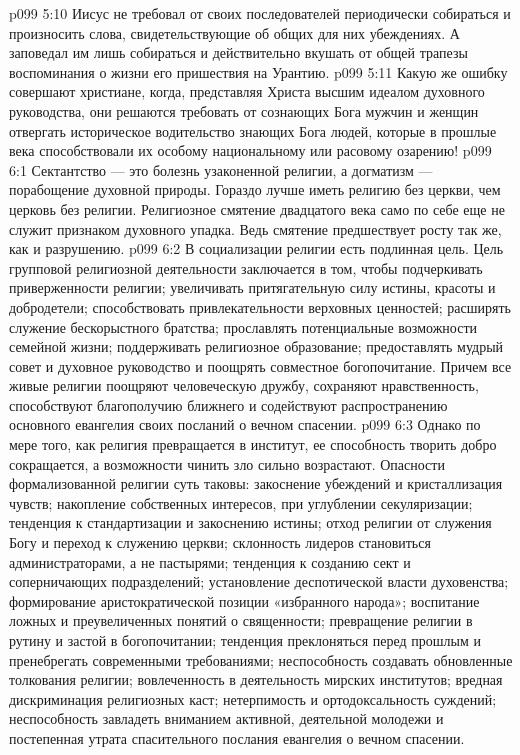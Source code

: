 \vs p099 5:10 Иисус не требовал от своих последователей периодически собираться и произносить слова, свидетельствующие об общих для них убеждениях. А заповедал им лишь собираться и действительно  вкушать от общей трапезы воспоминания о жизни его пришествия на Урантию.
\vs p099 5:11 \pc Какую же ошибку совершают христиане, когда, представляя Христа высшим идеалом духовного руководства, они решаются требовать от сознающих Бога мужчин и женщин отвергать историческое водительство знающих Бога людей, которые в прошлые века способствовали их особому национальному или расовому озарению!
\vs p099 6:1 Сектантство --- это болезнь узаконенной религии, а догматизм --- порабощение духовной природы. Гораздо лучше иметь религию без церкви, чем церковь без религии. Религиозное смятение двадцатого века само по себе еще не служит признаком духовного упадка. Ведь смятение предшествует росту так же, как и разрушению.
\vs p099 6:2 В социализации религии есть подлинная цель. Цель групповой религиозной деятельности заключается в том, чтобы подчеркивать приверженности религии; увеличивать притягательную силу истины, красоты и добродетели; способствовать привлекательности верховных ценностей; расширять служение бескорыстного братства; прославлять потенциальные возможности семейной жизни; поддерживать религиозное образование; предоставлять мудрый совет и духовное руководство и поощрять совместное богопочитание. Причем все живые религии поощряют человеческую дружбу, сохраняют нравственность, способствуют благополучию ближнего и содействуют распространению основного евангелия своих посланий о вечном спасении.
\vs p099 6:3 Однако по мере того, как религия превращается в институт, ее способность творить добро сокращается, а возможности чинить зло сильно возрастают. Опасности формализованной религии суть таковы: закоснение убеждений и кристаллизация чувств; накопление собственных интересов, при углублении секуляризации; тенденция к стандартизации и закоснению истины; отход религии от служения Богу и переход к служению церкви; склонность лидеров становиться администраторами, а не пастырями; тенденция к созданию сект и соперничающих подразделений; установление деспотической власти духовенства; формирование аристократической позиции «избранного народа»; воспитание ложных и преувеличенных понятий о священности; превращение религии в рутину и застой в богопочитании; тенденция преклоняться перед прошлым и пренебрегать современными требованиями; неспособность создавать обновленные толкования религии; вовлеченность в деятельность мирских институтов; вредная дискриминация религиозных каст; нетерпимость и ортодоксальность суждений; неспособность завладеть вниманием активной, деятельной молодежи и постепенная утрата спасительного послания евангелия о вечном спасении.
